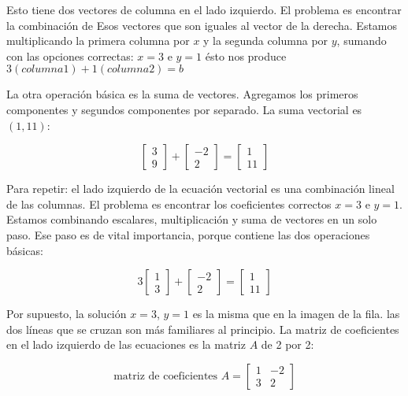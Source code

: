 Esto tiene dos vectores de columna en el lado izquierdo. El problema es encontrar la combinación de
Esos vectores que son iguales al vector de la derecha. Estamos multiplicando la primera columna por $x$
y la segunda columna por $y$, sumando con las opciones correctas: $x=3$ e $y=1$ ésto nos produce
$3(columna1)+1(columna2)=b$

La otra operación básica es la suma de vectores. Agregamos los primeros componentes y
segundos componentes por separado. La suma vectorial es $(1,11)$:

\begin{equation*}
	\begin{bmatrix} 3\\ 9 \end{bmatrix}+\begin{bmatrix} -2\\ 2 \end{bmatrix}=\begin{bmatrix} 1\\ 11 \end{bmatrix}
\end{equation*}

Para repetir: el lado izquierdo de la ecuación vectorial es una combinación lineal de las columnas.
El problema es encontrar los coeficientes correctos $x = 3$ e $y = 1$. Estamos combinando escalares,
multiplicación y suma de vectores en un solo paso. Ese paso es de vital importancia, porque
contiene las dos operaciones básicas:

\begin{equation*}
	3\begin{bmatrix} 1\\ 3 \end{bmatrix}+\begin{bmatrix} -2\\ 2 \end{bmatrix}=\begin{bmatrix} 1\\ 11 \end{bmatrix}
\end{equation*}

Por supuesto, la solución $x = 3$, $y = 1$ es la misma que en la imagen de la fila. las dos líneas que se cruzan son más familiares al principio.
La matriz de coeficientes en el lado izquierdo de las ecuaciones es la matriz $A$ de 2 por 2:

\begin{equation*}
	\text{matriz de coeficientes } A=\begin{bmatrix} 1& -2\\ 3& 2\end{bmatrix}
\end{equation*}

